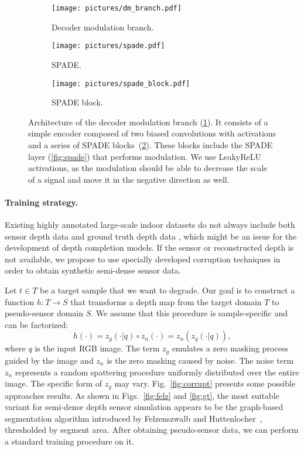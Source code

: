 \documentclass[final]{cvpr}
\begin{document}
    \begin{figure}[t]
      \centering
      \begin{subfigure}[b]{0.5\linewidth}
        \texttt{[image: pictures/dm\_branch.pdf]}
        \caption{Decoder modulation branch.}
        \label{fig:dm-impl}
      \end{subfigure}
      \begin{subfigure}[b]{0.4\linewidth}
        \centering
        \texttt{[image: pictures/spade.pdf]}
        \caption{SPADE.}
        \label{fig:spade}
        \centering
        \texttt{[image: pictures/spade\_block.pdf]}
        \caption{SPADE block.}
        \label{fig:spade-bl}
      \end{subfigure}
      \caption{Architecture of the decoder modulation branch (\ref{fig:dm-impl}). It consists of a simple encoder composed of two biased convolutions with activations and a series of SPADE blocks~(\ref{fig:spade-bl}). These blocks include the SPADE layer (\ref{fig:spade}) that performs modulation. We use LeakyReLU activations, as the modulation should be able to decrease the scale of a signal and move it in the negative direction as well.}
\label{fig:dm}
    \end{figure}
    
    \paragraph{Training strategy.}
    Existing highly annotated large-scale indoor datasets do not always include both sensor depth data and ground truth depth data \cite{taskonomy2018, nyuv2}, which might be an issue for the development of depth completion models. If the sensor or reconstructed depth is not available, we propose to use specially developed corruption techniques in order to obtain synthetic semi-dense sensor data.
    
    Let $t \in T$ be a target sample that we want to degrade. Our goal is to construct a function $h: T \to S$ that transforms a depth map from the target domain $T$ to pseudo-sensor domain $S$. We assume that this procedure is sample-specific and can be factorized:
$$
    h(\cdot) = z_g(\cdot | q) \circ z_n(\cdot) = z_n(z_g(\cdot | q)),
    $$
where $q$ is the input RGB image. The term $z_g$ emulates a zero masking process guided by the image and $z_n$ is the zero masking caused by noise. The noise term $z_n$ represents a random spattering procedure uniformly distributed over the entire image. The specific form of $z_g$ may vary. Fig.~\ref{fig:corrupt} presents some possible approaches results. As shown in Figs.~\ref{fig:felz} and \ref{fig:gt}, the most suitable variant for semi-dense depth sensor simulation appears to be the graph-based segmentation algorithm introduced by Felzenszwalb and Huttenlocher~\cite{felzenszwalb}, thresholded by segment area. After obtaining pseudo-sensor data, we can perform a standard training procedure on it.
 
\end{document}
